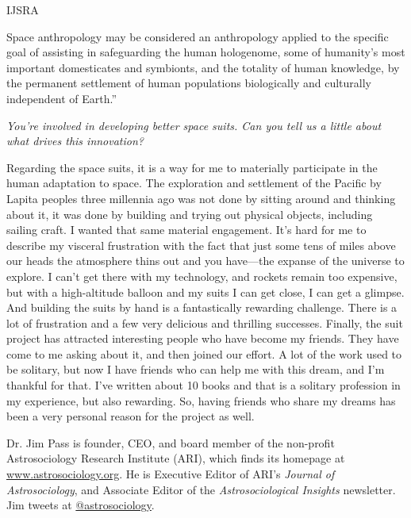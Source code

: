 \begin{labeling}{IJSRA}
\begin{enumerate}
	\end{enumerate}

	Space anthropology may be considered an anthropology applied to the specific goal of assisting in safeguarding the human hologenome, some of humanity’s most important domesticates and symbionts, and the totality of human knowledge, by the permanent settlement of human populations biologically and culturally independent of Earth.”

	\item[IJSRA] \emph{You're involved in developing better space suits. Can you tell us a little about what drives this innovation?}

	\item[CMS] Regarding the space suits, it is a way for me to materially participate in the human adaptation to space. The exploration and settlement of the Pacific by Lapita peoples three millennia ago was not done by sitting around and thinking about it, it was done by building and trying out physical objects, including sailing craft. I wanted that same material engagement. It's hard for me to describe my visceral frustration with the fact that just some tens of miles above our heads the atmosphere thins out and you have—the expanse of the universe to explore. I can't get there with my technology, and rockets remain too expensive, but with a high-altitude balloon and my suits I can get close, I can get a glimpse. And building the suits by hand is a fantastically rewarding challenge. There is a lot of frustration and a few very delicious and thrilling successes. Finally, the suit project has attracted interesting people who have become my friends. They have come to me asking about it, and then joined our effort. A lot of the work used to be solitary, but now I have friends who can help me with this dream, and I'm thankful for that. I've written about \num{10} books and that is a solitary profession in my experience, but also rewarding. So, having friends who share my dreams has been a very personal reason for the project as well.

\end{labeling}

\IJSRAseparator

\newpage


Dr. Jim Pass is founder, CEO, and board member of the non-profit Astrosociology Research Institute (ARI), which finds its homepage at \href{<www.astrosociology.org>}{www.astrosociology.org}. He is Executive Editor of ARI’s \emph{Journal of Astrosociology}, and Associate Editor of the \emph{Astrosociological Insights} newsletter. Jim tweets at \href{<twitter.com/astrosociology>}{@astrosociology}.


